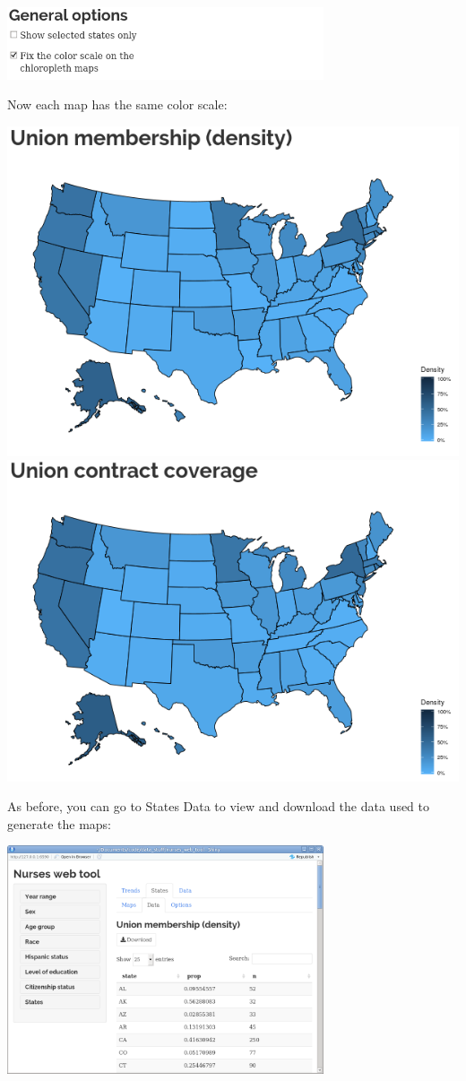 \documentclass[letterpaper,12pt]{article}
\begin{document}
\begin{enumerate}
  \begin{center}
    \includegraphics[width=0.7\textwidth]{images/maps_ex2/scale_options.png}
  \end{center}
  Now each map has the same color scale:
  \begin{center}
    \includegraphics[width=0.49\linewidth]{images/maps_ex2/membership_map2.png}
    \includegraphics[width=0.49\linewidth]{images/maps_ex2/coverage_map2.png}
  \end{center}

  As before, you can go to States \textrightarrow{} Data to view and
  download the data used to generate the maps:
  \begin{center}
    \includegraphics[width=0.7\textwidth]{images/maps_ex2/data_interface.png}
  \end{center}
  
\end{enumerate}
\end{document}
